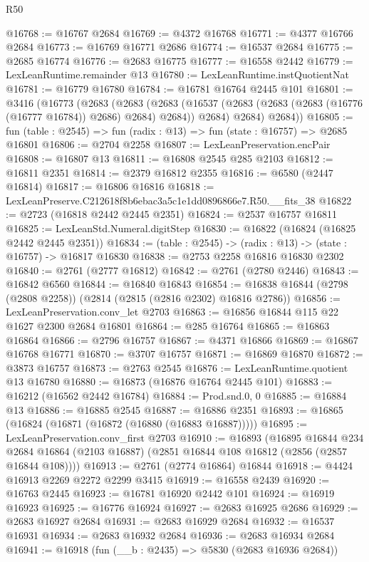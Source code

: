 \begin{lexlean}{R50}
\begin{coremodule}
@16768 := @16767 @2684
@16769 := @4372 @16768
@16771 := @4377 @16766 @2684
@16773 := @16769 @16771 @2686
@16774 := @16537 @2684
@16775 := @2685 @16774
@16776 := @2683 @16775
@16777 := @16558 @2442
@16779 := LexLeanRuntime.remainder @13
@16780 := LexLeanRuntime.instQuotientNat
@16781 := @16779 @16780
@16784 := @16781 @16764 @2445 @101
@16801 := @3416
    (@16773
      (@2683
        (@2683
          (@2683 (@16537 (@2683 (@2683 (@2683 (@16776 (@16777 @16784)) @2686) @2684) @2684)) @2684)
          @2684)
        @2684))
@16805 := fun (table : @2545) => fun (radix : @13) => fun (state : @16757) => @2685 @16801
@16806 := @2704 @2258
@16807 := LexLeanPreservation.encPair
@16808 := @16807 @13
@16811 := @16808 @2545 @285 @2103
@16812 := @16811 @2351
@16814 := @2379 @16812 @2355
@16816 := @6580 (@2447 @16814)
@16817 := @16806 @16816
@16818 := LexLeanPreserve.C212618f8b6ebac3a5c1e1dd0896866e7.R50.__fits_38
@16822 := @2723 (@16818 @2442 @2445 @2351)
@16824 := @2537 @16757 @16811
@16825 := LexLeanStd.Numeral.digitStep
@16830 := @16822 (@16824 (@16825 @2442 @2445 @2351))
@16834 := (table : @2545) -> (radix : @13) -> (state : @16757) -> @16817 @16830
@16838 := @2753 @2258 @16816 @16830 @2302
@16840 := @2761 (@2777 @16812)
@16842 := @2761 (@2780 @2446)
@16843 := @16842 @6560
@16844 := @16840 @16843
@16854 := @16838 @16844 (@2798 (@2808 @2258)) (@2814 (@2815 (@2816 @2302) @16816 @2786))
@16856 := LexLeanPreservation.conv_let @2703
@16863 := @16856 @16844 @115 @22 @1627 @2300 @2684 @16801
@16864 := @285 @16764
@16865 := @16863 @16864
@16866 := @2796 @16757
@16867 := @4371 @16866
@16869 := @16867 @16768 @16771
@16870 := @3707 @16757
@16871 := @16869 @16870
@16872 := @3873 @16757
@16873 := @2763 @2545
@16876 := LexLeanRuntime.quotient @13 @16780
@16880 := @16873 (@16876 @16764 @2445 @101)
@16883 := @16212 (@16562 @2442 @16784)
@16884 := Prod.snd.{0, 0}
@16885 := @16884 @13
@16886 := @16885 @2545
@16887 := @16886 @2351
@16893 := @16865 (@16824 (@16871 (@16872 (@16880 (@16883 @16887)))))
@16895 := LexLeanPreservation.conv_first @2703
@16910 := @16893
    (@16895
      @16844
      @234
      @2684
      @16864
      (@2103 @16887)
      (@2851 @16844 @108 @16812 (@2856 (@2857 @16844 @108))))
@16913 := @2761 (@2774 @16864) @16844
@16918 := @4424 @16913 @2269 @2272 @2299 @3415
@16919 := @16558 @2439
@16920 := @16763 @2445
@16923 := @16781 @16920 @2442 @101
@16924 := @16919 @16923
@16925 := @16776 @16924
@16927 := @2683 @16925 @2686
@16929 := @2683 @16927 @2684
@16931 := @2683 @16929 @2684
@16932 := @16537 @16931
@16934 := @2683 @16932 @2684
@16936 := @2683 @16934 @2684
@16941 := @16918 (fun (__b : @2435) => @5830 (@2683 @16936 @2684))

\end{coremodule}
\end{lexlean}
